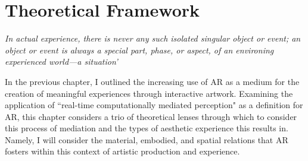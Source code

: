 \chapter{Theoretical Framework}
\label{sec: theory}
\epigraph{\emph{In actual experience, there is never any such isolated singular object or event; an object or event is always a special part, phase, or aspect, of an environing experienced world—a situation'}}{\citep[p. 67]{dewey1934}}
In the previous chapter, I outlined the increasing use of AR as a medium for the creation of meaningful experiences through interactive artwork. Examining the application of ``real-time computationally mediated perception" \citep{kiefer2018} as a definition for AR, this chapter considers a trio of theoretical lenses through which to consider this process of mediation and the types of aesthetic experience this results in. Namely, I will consider the material, embodied, and spatial relations that AR fosters within this context of artistic production and experience.



